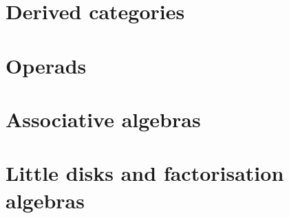 \documentclass{article}
\begin{document}
\section{Derived categories}



\section{Operads}

\nyw

\section{Associative algebras}

\nyw

\section{Little disks and factorisation algebras}

\nyw


\end{document}
